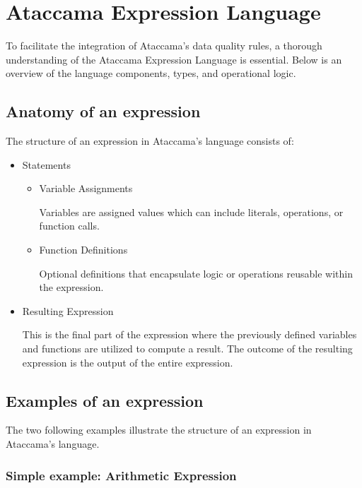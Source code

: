 \section{Ataccama Expression Language}

To facilitate the integration of Ataccama's data quality rules, a thorough understanding of the Ataccama Expression Language is essential. Below is an overview of the language components, types, and operational logic.

\subsection{Anatomy of an expression}

The structure of an expression in Ataccama's language consists of:

\begin{itemize}

\item Statements

    \begin{itemize}
        \item Variable Assignments
        
        Variables are assigned values which can include literals, operations, or function calls.
        \item Function Definitions
        
        Optional definitions that encapsulate logic or operations reusable within the expression.
    \end{itemize}
\item Resulting Expression

This is the final part of the expression where the previously defined variables and functions are utilized to compute a result. The outcome of the resulting expression is the output of the entire expression.
\end{itemize}

\subsection{Examples of an expression}

The two following examples illustrate the structure of an expression in Ataccama's language.

\subsubsection{Simple example: Arithmetic Expression}

